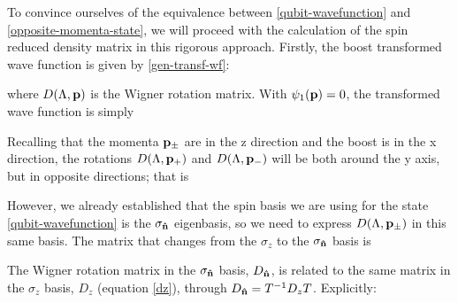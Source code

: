 \documentclass[12pt,a4paper,notitlepage]{report}
\begin{document}
To convince ourselves of the equivalence between \eqref{qubit-wavefunction} and \eqref{opposite-momenta-state}, we will proceed with the calculation of the spin reduced density matrix in this rigorous approach. Firstly, the boost transformed wave function is given by \eqref{gen-transf-wf}:

where $D(\Lambda, \vb{p})$ is the Wigner rotation matrix. With $\psi_1(\vb{p}) = 0$, the transformed wave function is simply

%
Recalling that the momenta $\vb{p}_{\pm}$ are in the z direction and the boost is in the x direction, the rotations $D(\Lambda, \vb{p}_+)$ and $D(\Lambda, \vb{p}_-)$ will be both around the y axis, but in opposite directions; that is

%
However, we already established that the spin basis we are using for the state \eqref{qubit-wavefunction} is the $\sigma_{\vu{n}}$ eigenbasis, so we need to express $D(\Lambda, \vb{p}_{\pm})$ in this same basis. The matrix that changes from the $\sigma_z$ to the $\sigma_{\vu{n}}$ basis is

%
The Wigner rotation matrix in the $\sigma_{\vu{n}}$ basis, $D_{\vu{n}}$, is related to the same matrix in the $\sigma_z$ basis, $D_z$ (equation \eqref{dz}), through $D_{\vu{n}} = T^{-1}D_zT$. Explicitly:
\end{document}
